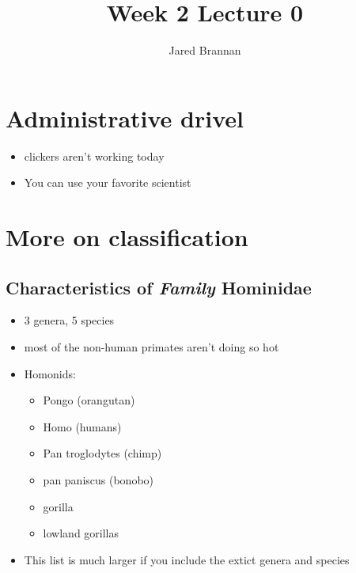 \documentclass{article}
\title{Week 2 Lecture 0}
\author{Jared Brannan }
\theoremstyle{definition}
\begin{document}
\maketitle
\section{Administrative drivel}
\begin{itemize}
	\item clickers aren't working today
	\item You can use your favorite scientist
\end{itemize}

\section{More on classification}
\subsection{Characteristics of \textit{Family} \textbf{Hominidae}}
\begin{itemize}
	\item 3 genera, 5 species 
	\item most of the non-human primates aren't doing so hot
	\item Homonids:
		\begin{itemize}
			\item Pongo (orangutan)
			\item Homo (humans)
			\item Pan troglodytes (chimp)
			\item pan paniscus (bonobo)
			\item gorilla
			\item lowland gorillas
		\end{itemize}
	\item This list is much larger if you include the extict genera and species
\end{itemize}
\end{document}
